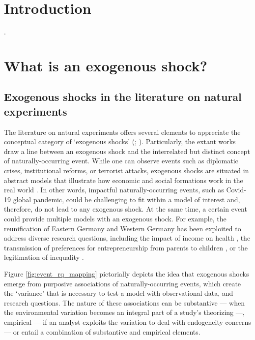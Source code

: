 \begin{refsection}

\section{Introduction}
\label{sec:introduction}

%
.

\section{What is an exogenous shock?}
\label{sec:what_exogenous_shocks}

\subsection{Exogenous shocks in the literature on natural experiments}
\label{subsec:exogenous_shocks_and_ne}

\noindent The literature on natural experiments offers several elements to
appreciate the conceptual category of `exogenous shocks' (\cite[for an overview
of the natural experiment design, see for example][]{withers_li_2021,
dunning_2012,craig_et_al_2017,keele_et_al_2016}; \cite[for a review of the
application of this design, see][]{sekhon_titiunik_2012,sieweke_santoni_2020,
roseinzweig_et_al_2000}). Particularly, the extant works draw a line between an
exogenous shock and the interrelated but distinct concept of naturally-occurring
event. While one can observe events such as diplomatic crises, institutional
reforms, or terrorist attacks, exogenous shocks are situated in abstract models
that illustrate how economic and social formations work in the real world
\parencite{morgan_2012}. In other words, impactful naturally-occurring events,
such as Covid-19 global pandemic, could be challenging to fit within a model of
interest and, therefore, do not lead to any exogenous shock. At the same time, a
certain event could provide multiple models with an exogenous shock.  For
example, the reunification of Eastern Germany and Western Germany has been
exploited to address diverse research questions, including the impact of income
on health \parencite[e.g.][]{frijters_et_al_2004}, the transmission of
preferences for entrepreneurship from parents to children
\parencite[e.g.][]{wyrwich_2015}, or the legitimation of inequality
\parencite[e.g.][]{haack_sieweke_2018}.

Figure \ref{fig:event_rq_mapping} pictorially depicts the idea that exogenous 
shocks emerge from purposive associations of naturally-occurring events, which
create the `variance' that is necessary to test a model with observational data,
and research questions. The nature of these associations can be substantive 
--- when the environmental variation becomes an integral part of a study's 
theorizing ---, empirical --- if an analyst exploits the variation to deal with
endogeneity concerns --- or entail a combination of substantive and
empirical elements.


\end{refsection}
